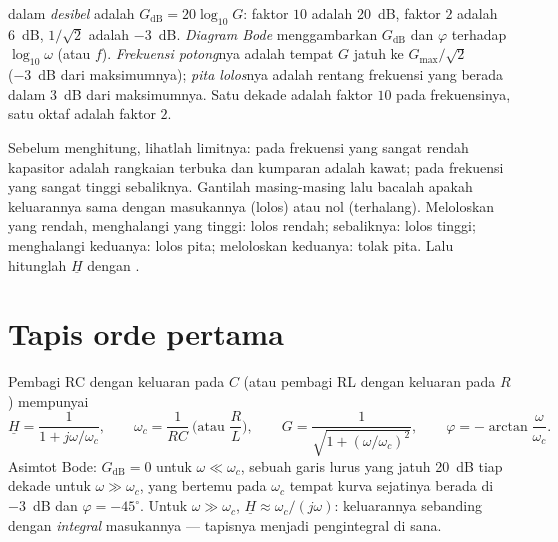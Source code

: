 \begin{definition}\label{def:b1:filters-transfer-functions:bode}
 dalam \emph{desibel} adalah $G_{\mathrm{dB}} = 20\log_{10}G$:
faktor $10$ adalah \qty{20}{dB}, faktor $2$ adalah \qty{6}{dB},
$1/\sqrt2$ adalah \qty{-3}{dB}. \emph{Diagram Bode} menggambarkan
$G_{\mathrm{dB}}$ dan $\varphi$ terhadap $\log_{10}\omega$ (atau $f$).
\emph{Frekuensi potong}nya adalah tempat $G$ jatuh ke $G_{\max}/\sqrt2$
(\qty{-3}{dB} dari maksimumnya); \emph{pita lolos}nya adalah rentang
frekuensi yang berada dalam \qty{3}{dB} dari maksimumnya. Satu dekade
adalah faktor $10$ pada frekuensinya, satu oktaf adalah faktor $2$.
\end{definition}

\begin{method}\label{met:b1:filters-transfer-functions:nature}
Sebelum menghitung, lihatlah limitnya: pada frekuensi yang sangat rendah
kapasitor adalah rangkaian terbuka dan kumparan adalah kawat; pada
frekuensi yang sangat tinggi sebaliknya. Gantilah masing-masing lalu
bacalah apakah keluarannya sama dengan masukannya (lolos) atau nol
(terhalang). Meloloskan yang rendah, menghalangi yang tinggi: lolos
rendah; sebaliknya: lolos tinggi; menghalangi keduanya: lolos pita;
meloloskan keduanya: tolak pita. Lalu hitunglah $\underline H$ dengan
.
\end{method}

\section{Tapis orde pertama}

\begin{proposition}\label{prop:b1:filters-transfer-functions:lowpass1}
Pembagi RC dengan keluaran pada $C$ (atau pembagi RL dengan keluaran
pada $R$) mempunyai
\[
\underline H = \frac{1}{1 + j\omega/\omega_c}, \qquad
\omega_c = \frac{1}{RC} \ \Big(\text{atau } \frac{R}{L}\Big),
\qquad G = \frac{1}{\sqrt{1 + (\omega/\omega_c)^2}}, \qquad
\varphi = -\arctan\frac{\omega}{\omega_c} .
\]
Asimtot Bode: $G_{\mathrm{dB}} = 0$ untuk $\omega \ll \omega_c$, sebuah
garis lurus yang jatuh \qty{20}{dB} tiap dekade untuk
$\omega \gg \omega_c$, yang bertemu pada $\omega_c$ tempat kurva
sejatinya berada di \qty{-3}{dB} dan $\varphi = -45^\circ$. Untuk
$\omega \gg \omega_c$, $\underline H \approx
\omega_c/(j\omega)$: keluarannya sebanding dengan \emph{integral}
masukannya --- tapisnya menjadi pengintegral di sana.
\end{proposition}

